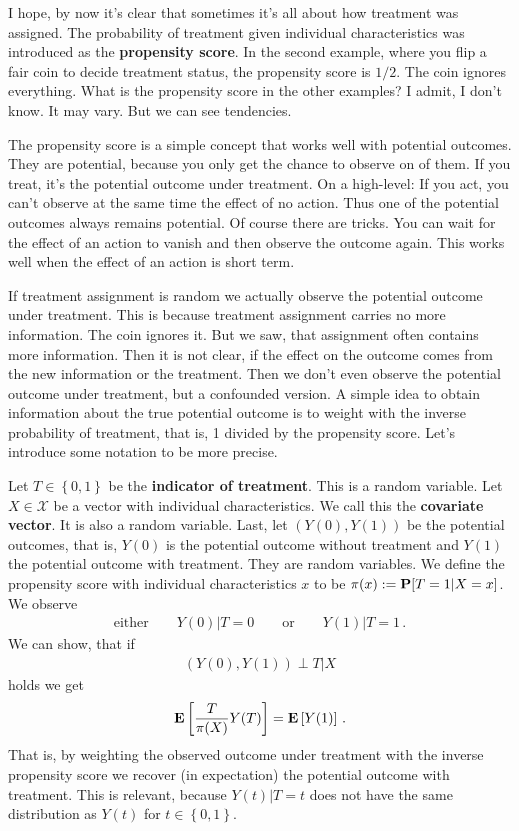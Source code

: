 I hope, by now it's clear that sometimes it's all about how treatment was assigned. 
The probability of treatment given individual characteristics 
was introduced as the \textbf{propensity score}\cite{Rosenbaum1983}.
In the second example, where you flip a fair coin to decide treatment status, the propensity score is $1/2$.
The coin ignores everything.
What is the propensity score in the other examples?
I admit, I don't know.
It may vary.
But we can see tendencies. 

The propensity score is a simple concept that works well with potential outcomes.
They are potential, because you only get the chance to observe on of them. If you treat, it's the potential outcome under treatment. 
On a high-level: If you act, you can't observe at the same time the effect of no action.
Thus one of the potential outcomes always remains potential.
Of course there are tricks. You can  wait for the effect of an action to vanish and then observe the outcome again.
This works well when the effect of an action is short term.

If treatment assignment is random we actually observe the potential outcome under treatment.
This is because treatment assignment carries no more information.
The coin ignores it.
But we saw, that assignment often contains more information.
Then it is not clear, if the effect on the outcome comes from the new information or the treatment.
Then we don't even observe the potential outcome under treatment, but a confounded version.
A simple idea to obtain information about the true potential outcome is to weight with the inverse probability of treatment, that is, 1 divided by the propensity score. Let's introduce some notation to be more precise.

Let $T\in \left\{ 0,1 \right\}$ be the \textbf{indicator of treatment}. This is a random variable.
Let $X\in\mathcal{X}$ be a vector with individual characteristics. We call this the \textbf{covariate vector}. It is also a random variable.
Last, let $(Y(0),Y(1))$ be the potential outcomes, that is, $Y(0)$ is the potential outcome without treatment and $Y(1)$ the potential outcome with treatment. They are random variables.
We define the propensity score with individual characteristics $x$ to be
$\pi(x):=\P[T=1|X=x]$. We observe  
\begin{gather}
  \text{either}
  \qquad
  Y(0)|T=0
  \qquad
  \text{or}\qquad
  Y(1)|T=1
  \,.
\end{gather}
We can show, that if 
\begin{gather}
  (Y(0),Y(1))\perp T |X
\end{gather}
holds we get 
\begin{gather}
  \label{ipw}
  \E
  \left[ 
    \frac{T}{\pi(X)}Y(T)
  \right]
  =
  \E
  \left[ Y(1) \right]
  \,.
\end{gather}
That is, by weighting the observed outcome under treatment with the inverse propensity score we recover (in expectation) the potential outcome with treatment. 
This is relevant, because 
$Y(t)|T=t$ does not have the same distribution as $Y(t)$ for $t\in \left\{ 0,1 \right\}$.

